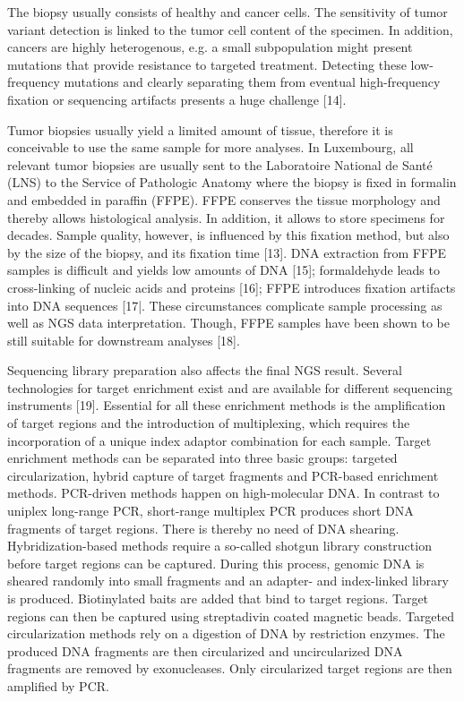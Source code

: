 The biopsy usually consists of healthy and cancer cells. The sensitivity of
tumor variant detection is linked to the tumor cell content of the specimen. In
addition, cancers are highly heterogenous, e.g. a small subpopulation might
present mutations that provide resistance to targeted treatment. Detecting these
low-frequency mutations and clearly separating them from eventual high-frequency
fixation or sequencing artifacts presents a huge challenge [14].

Tumor biopsies usually yield a limited amount of tissue, therefore it is
conceivable to use the same sample for more analyses. In Luxembourg, all
relevant tumor biopsies are usually sent to the Laboratoire National de Santé
(LNS) to the Service of Pathologic Anatomy where the biopsy is fixed in formalin
and embedded in paraffin (FFPE). FFPE conserves the tissue morphology and
thereby allows histological analysis. In addition, it allows to store specimens
for decades. Sample quality, however, is influenced by this fixation method, but
also by the size of the biopsy, and its fixation time [13]. DNA extraction from
FFPE samples is difficult and yields low amounts of DNA [15]; formaldehyde leads
to cross-linking of nucleic acids and proteins [16]; FFPE introduces fixation
artifacts into DNA sequences [17|. These circumstances complicate sample
processing as well as NGS data interpretation. Though, FFPE samples have been
shown to be still suitable for downstream analyses [18].

Sequencing library preparation also affects the final NGS result. Several
technologies for target enrichment exist and are available for different
sequencing instruments [19]. Essential for all these enrichment methods is the
amplification of target regions and the introduction of multiplexing, which
requires the incorporation of a unique index adaptor combination for each
sample. Target enrichment methods can be separated into three basic groups:
targeted circularization, hybrid capture of target fragments and PCR-based
enrichment methods. PCR-driven methods happen on high-molecular DNA. In contrast
to uniplex long-range PCR, short-range multiplex PCR produces short DNA
fragments of target regions. There is thereby no need of DNA shearing.
Hybridization-based methods require a so-called shotgun library construction
before target regions can be captured. During this process, genomic DNA is
sheared randomly into small fragments and an adapter- and index-linked library
is produced. Biotinylated baits are added that bind to target regions. Target
regions can then be captured using streptadivin coated magnetic beads. Targeted
circularization methods rely on a digestion of DNA by restriction enzymes. The
produced DNA fragments are then circularized and uncircularized DNA fragments
are removed by exonucleases. Only circularized target regions are then amplified
by PCR.

